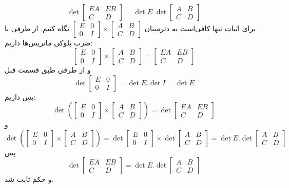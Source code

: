 \documentclass[12pt,a4paper]{article}
\begin{document}
\subsection{}
$$
\det \begin{bmatrix}EA&EB\\C&D\end{bmatrix} =
 \det E . \det \begin{bmatrix}
A&B\\C&D
\end{bmatrix}
$$
برای اثبات تنها کافی‌است به دترمینان
$\begin{bmatrix}E&0\\0&I\end{bmatrix}\times
\begin{bmatrix}A&B\\C&D\end{bmatrix}$
نگاه کنیم.
از طرفی با ضرب بلوکی ماتریس‌ها داریم:
$$\begin{bmatrix}E&0\\0&I\end{bmatrix}\times
\begin{bmatrix}A&B\\C&D\end{bmatrix} = \begin{bmatrix}EA&EB\\C&D\end{bmatrix}$$
و از طرفی طبق قسمت قبل 
$$\det \begin{bmatrix}E&0\\0&I\end{bmatrix} = \det E . \det I = \det E$$
پس داریم:
$$\det \left(\begin{bmatrix}E&0\\0&I\end{bmatrix}\times
\begin{bmatrix}A&B\\C&D\end{bmatrix}\right) = \det \begin{bmatrix}EA&EB\\C&D\end{bmatrix}$$
و
$$\det \left(\begin{bmatrix}E&0\\0&I\end{bmatrix}\times
\begin{bmatrix}A&B\\C&D\end{bmatrix}\right) = 
\det \begin{bmatrix}E&0\\0&I\end{bmatrix}\times
\det \begin{bmatrix}A&B\\C&D\end{bmatrix} = \det E . \det \begin{bmatrix}A&B\\C&D\end{bmatrix} $$
پس
$$
\det \begin{bmatrix}EA&EB\\C&D\end{bmatrix} = \det E . \det \begin{bmatrix}A&B\\C&D\end{bmatrix}
$$
و حکم ثابت شد.
\end{document}

